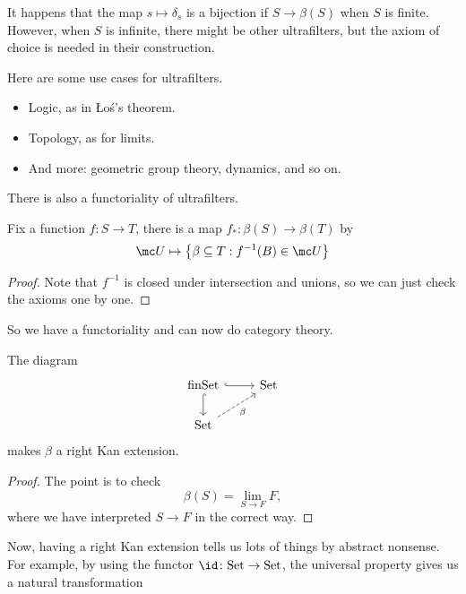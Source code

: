 It happens that the map $s\mapsto\delta_s$ is a bijection if $S\to\beta(S)$ when $S$ is finite. However, when $S$ is infinite, there might be other ultrafilters, but the axiom of choice is needed in their construction.
\begin{remark}
	Here are some use cases for ultrafilters.
	\begin{itemize}
		\item Logic, as in \L{}o\'s's theorem.
		\item Topology, as for limits.
		\item And more: geometric group theory, dynamics, and so on.
	\end{itemize}
\end{remark}
There is also a functoriality of ultrafilters.
\begin{proposition}
	Fix a function $f\colon S\to T$, there is a map $f_*\colon\beta(S)\to\beta(T)$ by
	\[\mc U\mapsto\left\{\beta\subseteq T:f^{-1}(B)\in\mc U\right\}\]
\end{proposition}
\begin{proof}
	Note that $f^{-1}$ is closed under intersection and unions, so we can just check the axioms one by one.
\end{proof}
So we have a functoriality and can now do category theory.
\begin{theorem}
	The diagram
	\[\begin{tikzcd}
		{\mathrm{finSet}} & {\mathrm{Set}} \\
		{\mathrm{Set}}
		\arrow[hook, from=1-1, to=1-2]
		\arrow[hook, from=1-1, to=2-1]
		\arrow["\beta"', dashed, from=2-1, to=1-2]
	\end{tikzcd}\]
	makes $\beta$ a right Kan extension.
\end{theorem}
\begin{proof}
	The point is to check
	\[\beta(S)=\lim_{S\to F}F,\]
	where we have interpreted $S\to F$ in the correct way.
\end{proof}
Now, having a right Kan extension tells us lots of things by abstract nonsense. For example, by using the functor $\id\colon\mathrm{Set}\to\mathrm{Set}$, the universal property gives us a natural transformation
